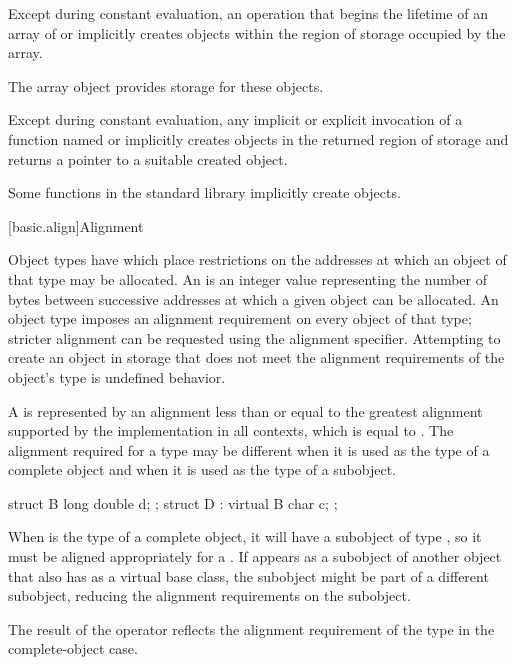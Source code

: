 \pnum
Except during constant evaluation,
an operation that begins the lifetime of
an array of  or 
implicitly creates objects within the region of storage occupied by the array.
\begin{note}
The array object provides storage for these objects.
\end{note}
Except during constant evaluation,
any implicit or explicit invocation of a function
named  or 
implicitly creates objects in the returned region of storage and
returns a pointer to a suitable created object.
\begin{note}
Some functions in the \Cpp{} standard library implicitly create
objects.
\end{note}

[basic.align]{Alignment}

\pnum
Object types have 
which place restrictions on the addresses at which an object of that type
may be allocated. An  is an 
integer value representing the number of bytes between successive addresses
at which a given object can be allocated. An object type imposes an alignment
requirement on every object of that type; stricter alignment can be requested
using the alignment specifier.
Attempting to create an object in storage that
does not meet the alignment requirements of the object's type
is undefined behavior.

\pnum
A  is represented by an alignment
less than or equal to the greatest alignment supported by the implementation in
all contexts, which is equal to
.
The alignment required for a type may be different when it is used as the type
of a complete object and when it is used as the type of a subobject.
\begin{example}
\begin{codeblock}
struct B { long double d; };
struct D : virtual B { char c; };
\end{codeblock}

When  is the type of a complete object, it will have a subobject of
type , so it must be aligned appropriately for a .
If  appears as a subobject of another object that also has 
as a virtual base class, the  subobject might be part of a different
subobject, reducing the alignment requirements on the  subobject.
\end{example}
The result of the  operator reflects the alignment
requirement of the type in the complete-object case.

